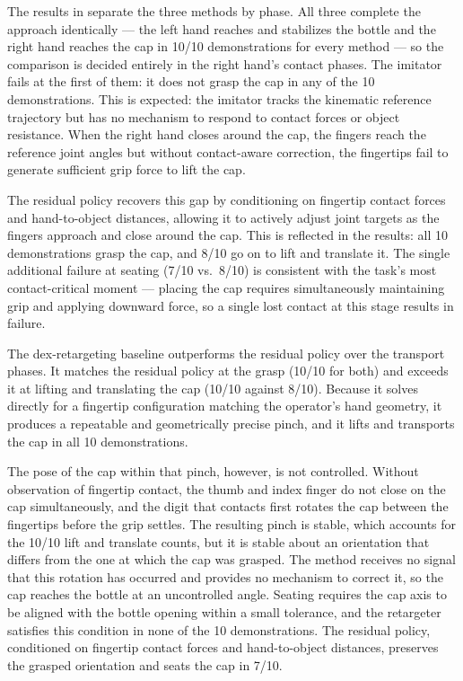 The results in  separate the three methods by phase.
All three complete the approach identically --- the left hand reaches and stabilizes the
bottle and the right hand reaches the cap in 10/10 demonstrations for every method --- so
the comparison is decided entirely in the right hand's contact phases.
The imitator fails at the first of them: it does not grasp the cap in any of the
10 demonstrations.
This is expected: the imitator tracks the kinematic reference trajectory but has no
mechanism to respond to contact forces or object resistance.
When the right hand closes around the cap, the fingers reach the reference joint
angles but without contact-aware correction, the fingertips fail to generate
sufficient grip force to lift the cap.

The residual policy recovers this gap by conditioning on fingertip contact forces
and hand-to-object distances, allowing it to actively adjust joint targets as the
fingers approach and close around the cap.
This is reflected in the results: all 10 demonstrations grasp the cap, and 8/10 go
on to lift and translate it.
The single additional failure at seating (7/10 vs.\ 8/10) is consistent with
the task's most contact-critical moment --- placing the cap requires simultaneously
maintaining grip and applying downward force, so a single lost contact at this
stage results in failure.

The dex-retargeting baseline outperforms the residual policy over the transport phases.
It matches the residual policy at the grasp (10/10 for both) and exceeds it at lifting and
translating the cap (10/10 against 8/10). Because it solves directly for a fingertip
configuration matching the operator's hand geometry, it produces a repeatable and
geometrically precise pinch, and it lifts and transports the cap in all 10 demonstrations.

The pose of the cap within that pinch, however, is not controlled. Without observation of
fingertip contact, the thumb and index finger do not close on the cap simultaneously, and the
digit that contacts first rotates the cap between the fingertips before the grip settles. The
resulting pinch is stable, which accounts for the 10/10 lift and translate counts, but it is
stable about an orientation that differs from the one at which the cap was grasped. The method
receives no signal that this rotation has occurred and provides no mechanism to correct it, so
the cap reaches the bottle at an uncontrolled angle. Seating requires the cap axis to be
aligned with the bottle opening within a small tolerance, and the retargeter satisfies this
condition in none of the 10 demonstrations. The residual policy, conditioned on fingertip
contact forces and hand-to-object distances, preserves the grasped orientation and seats the
cap in 7/10.


